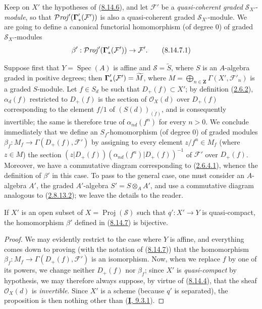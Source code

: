 \begin{env}[8.14.7]
\label{II.8.14.7}
Keep on $X'$ the hypotheses of
(\hyperref[II.8.14.6]{8.14.6}), and let $\mathcal{F}'$ be a
\emph{quasi-coherent graded} $\mathcal{S}_{X'}$-\emph{module}, so that
$\mathcal{P}\mathit{roj}'(\boldsymbol{\Gamma}'_*(\mathcal{F}'))$ is also a
quasi-coherent graded $\mathcal{S}_{X'}$-module. We are going to define a
canonical functorial homomorphism (of degree $0$) of
graded $\mathcal{S}_{X'}$-modules
\begin{equation}
\label{II.8.14.7.1}
  \beta':\mathcal{P}\mathit{roj}'(\boldsymbol{\Gamma}'_*(\mathcal{F}'))\to\mathcal{F}'.
\tag{8.14.7.1}
\end{equation}

Suppose first that $Y=\operatorname{Spec}(A)$ is affine and
$\mathcal{S}=\widetilde{S}$, where $S$ is an $A$-algebra graded in positive
degrees; then $\boldsymbol{\Gamma}'_*(\mathcal{F}')=\widetilde{M}$, where
$M=\bigoplus_{n\in\mathbf{Z}}\Gamma(X',\mathcal{F}'_n)$ is a graded
$S$-module. Let $f\in S_d$ be such that $D_+(f)\subset X'$; by definition
(\hyperref[II.2.6.2]{2.6.2}), $\alpha_d(f)$ restricted to $D_+(f)$ is the
section of $\mathcal{O}_X(d)$ over $D_+(f)$ corresponding to
the element $f/1$ of $(S(d))_{(f)}$, and is consequently invertible; the
same is therefore true of $\alpha_{nd}(f^n)$ for every $n>0$. We conclude
immediately that we define an $S_f$-homomorphism (of degree $0$) of graded
modules $\beta_f:M_f\to\Gamma(D_+(f),\mathcal{F}')$ by assigning to every
element $z/f^n\in M_f$ (where $z\in M$) the section
$(z|D_+(f))(\alpha_{nd}(f^n)|D_+(f))^{-1}$ of $\mathcal{F}'$ over
$D_+(f)$. Moreover, we have a commutative diagram corresponding to
(\hyperref[II.2.6.4.1]{2.6.4.1}), whence the definition of $\beta'$ in this
case. To pass to the general case, one must consider an $A$-algebra $A'$,
the graded $A'$-algebra $S'=S\otimes_A A'$, and use a commutative diagram
analogous to (\hyperref[II.2.8.13.2]{2.8.13.2}); we leave
the details to the reader.
\end{env}

\begin{proposition}[8.14.8]
\label{II.8.14.8}
If $X'$ is an open subset of $X=\operatorname{Proj}(\mathcal{S})$ such that
$q':X'\to Y$ is quasi-compact, the homomorphism $\beta'$ defined in
\textup{(\hyperref[II.8.14.7]{8.14.7})} is bijective.
\end{proposition}

\begin{proof}
We may evidently restrict to the case where $Y$ is affine, and everything
comes down to proving (with the notation of (\hyperref[II.8.14.7]{8.14.7}))
that the homomorphism $\beta_f:M_f\to\Gamma(D_+(f),\mathcal{F}')$ is an
isomorphism. Now, when we replace $f$ by one of its powers, we change neither
$D_+(f)$ nor $\beta_f$; since $X'$ is \emph{quasi-compact} by
hypothesis, we may therefore always suppose, by virtue of
(\hyperref[II.8.14.4]{8.14.4}), that the sheaf $\mathcal{O}_X(d)$ is
\emph{invertible}. Since $X'$ is a scheme (because $q'$ is separated), the
proposition is then nothing other than (\hyperref[I.9.3.1]{\textbf{I}, 9.3.1}).
\end{proof}

